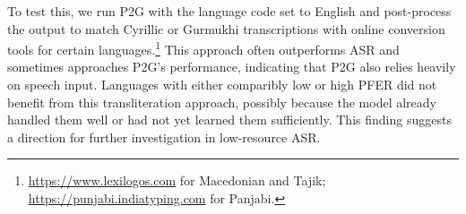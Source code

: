 To test this, we run P2G with the language code set to English and post-process the output to match Cyrillic or Gurmukhi transcriptions with online conversion tools for certain languages.\footnote{\url{https://www.lexilogos.com} for Macedonian and Tajik; \url{https://punjabi.indiatyping.com} for Panjabi.}
This approach often outperforms ASR and sometimes approaches P2G's performance, indicating that P2G also relies heavily on speech input.
Languages with either comparibly low or high PFER did not benefit from this transliteration approach, possibly because the model already handled them well or had not yet learned them sufficiently. 
This finding suggests a direction for further investigation in low-resource ASR.

\begin{table}
\vspace{-2mm}
\centering
\small
\setlength{\tabcolsep}{4pt} %
\renewcommand{\arraystretch}{1.4}
\caption{WER ($\downarrow$) of different P2G settings on low-resource languages ``Best'' stands for lowest WER in \autoref{tab:main-asr} from ASR models. $^*$ indicates post-processed languages.}
\label{tab:analysis-task-p2g}
\vspace{-2mm}
\end{table}


